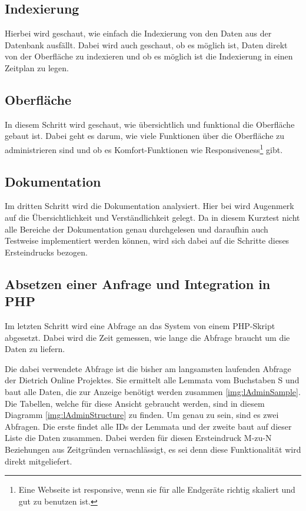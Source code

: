 \subsection{Indexierung}

Hierbei wird geschaut, wie einfach die Indexierung von den Daten aus der Datenbank ausfällt. Dabei wird auch geschaut, ob es möglich ist, Daten direkt von der Oberfläche zu indexieren und ob es möglich ist die Indexierung in einen Zeitplan zu legen.

\subsection{Oberfläche}
In diesem Schritt wird geschaut, wie übersichtlich und funktional die Oberfläche gebaut ist. Dabei geht es darum, wie viele Funktionen über die Oberfläche zu administrieren sind und ob es Komfort-Funktionen wie Responsiveness\footnote{Eine Webseite ist responsive, wenn sie für alle Endgeräte richtig skaliert und gut zu benutzen ist.} gibt.

\subsection{Dokumentation}

Im dritten Schritt wird die Dokumentation analysiert. Hier  bei wird Augenmerk auf die Übersichtlichkeit und Verständlichkeit gelegt. Da in diesem Kurztest nicht alle Bereiche der Dokumentation genau durchgelesen und daraufhin auch Testweise implementiert werden können, wird sich dabei auf die Schritte dieses Ersteindrucks bezogen.

\subsection{Absetzen einer Anfrage und Integration in PHP}

Im letzten Schritt wird eine Abfrage an das System von einem PHP-Skript abgesetzt. Dabei wird die Zeit gemessen, wie lange die Abfrage braucht um die Daten zu liefern.

Die dabei verwendete Abfrage ist die bisher am langsamsten laufenden Abfrage der Dietrich Online Projektes. Sie ermittelt alle Lemmata vom Buchstaben S und baut alle Daten, die zur Anzeige benötigt werden zusammen \ref{img:lAdminSample}. Die Tabellen, welche für diese Ansicht gebraucht werden, sind in diesem Diagramm \ref{img:lAdminStructure} zu finden. Um genau zu sein, sind es zwei Abfragen. Die erste findet alle IDs der Lemmata und der zweite baut auf dieser Liste die Daten zusammen. Dabei werden für diesen Ersteindruck M-zu-N Beziehungen aus Zeitgründen vernachlässigt, es sei denn diese Funktionalität wird direkt mitgeliefert.

